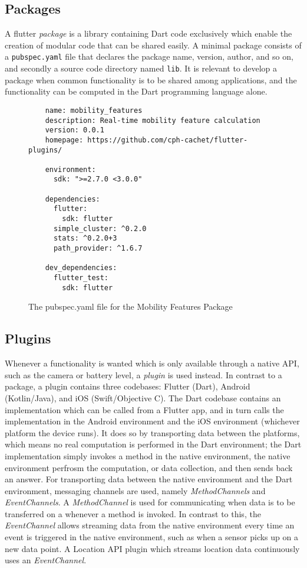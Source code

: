 \subsection{Packages}
A flutter \textit{package} is a library containing Dart code exclusively which  enable the creation of modular code that can be shared easily. A minimal package consists of a \verb|pubspec.yaml| file that declares the package name, version, author, and so on, and secondly a source code directory named \verb|lib|. It is relevant to develop a package when common functionality is to be shared among applications, and the functionality can be computed in the Dart programming language alone.

\begin{figure}
    \centering
    \begin{verbatim}
    name: mobility_features
    description: Real-time mobility feature calculation
    version: 0.0.1
    homepage: https://github.com/cph-cachet/flutter-plugins/
    
    environment:
      sdk: ">=2.7.0 <3.0.0"
    
    dependencies:
      flutter:
        sdk: flutter
      simple_cluster: ^0.2.0
      stats: ^0.2.0+3
      path_provider: ^1.6.7
    
    dev_dependencies:
      flutter_test:
        sdk: flutter
    \end{verbatim}
    \caption{The pubspec.yaml file for the Mobility Features Package}
    \label{fig:my_label}
\end{figure}

\subsection{Plugins}
Whenever a functionality is wanted which is only available through a native API, such as the camera or battery level, a \textit{plugin} is used instead. In contrast to a package, a plugin contains three codebases: Flutter (Dart), Android (Kotlin/Java), and iOS (Swift/Objective C). The Dart codebase contains an implementation which can be called from a Flutter app, and in turn calls the implementation in the Android environment and the iOS environment (whichever platform the device runs). It does so by transporting data between the platforms, which means no real computation is performed in the Dart environment; the Dart implementation simply invokes a method in the native environment, the native environment perfrosm the computation, or data collection, and then sends back an answer. For transporting data between the native environment and the Dart environment, messaging channels are used, namely \textit{MethodChannels} and \textit{EventChannels}. A \textit{MethodChannel} is used for communicating when data is to be transferred on a whenever a method is invoked. In contrast to this, the \textit{EventChannel} allows streaming data from the native environment every time an event is triggered in the native environment, such as when a sensor picks up on a new data point. A Location API plugin which streams location data continuously uses an \textit{EventChannel}.


